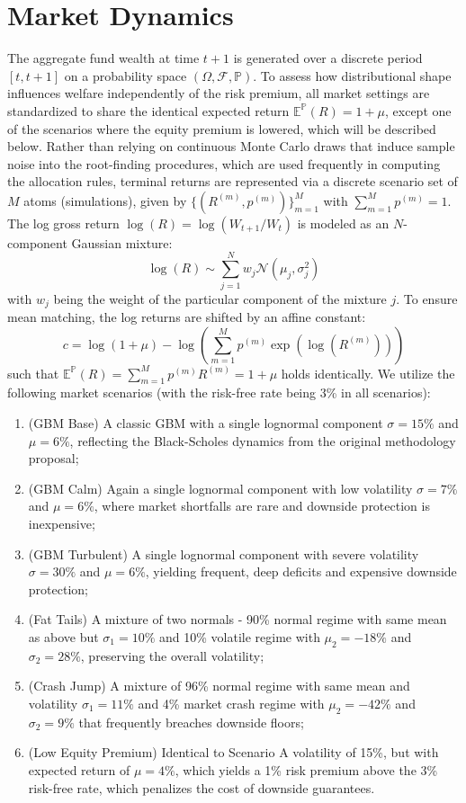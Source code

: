 \documentclass[11pt,a4paper]{article}
\theoremstyle{definition}
\theoremstyle{plain}
\theoremstyle{remark}
\newcommand{\E}{\mathbb{E}}
\renewcommand{\P}{\mathbb{P}}
\newcommand{\1}{\mathbf{1}}
\begin{document}
\section{Market Dynamics}
The aggregate fund wealth at time $t+1$ is generated over a discrete period $[t,t+1]$ on a probability space $(\Omega, \mathcal{F}, \P)$. To assess how distributional shape influences welfare independently of the risk premium, all market settings are standardized to share the identical expected return $\E^\P(R) = 1+\mu$, except one of the scenarios where the equity premium is lowered, which will be described below. Rather than relying on continuous Monte Carlo draws that induce sample noise into the root-finding procedures, which are used frequently in computing the allocation rules, terminal returns are represented via a discrete scenario set of $M$ atoms (simulations), given by $\{(R^{(m)}, p^{(m)})\}_{m=1}^M$ with $\sum_{m=1}^M p^{(m)} = 1$. The log gross return $\log(R) = \log(W_{t+1}/W_t)$ is modeled as an $N$-component Gaussian mixture:
\begin{equation*}
    \log(R) \sim \sum_{j=1}^N w_j \mathcal{N}(\mu_j, \sigma^2_j)
\end{equation*}
with $w_j$ being the weight of the particular component of the mixture $j$. To ensure mean matching, the log returns are shifted by an affine constant:
\begin{equation*}
    c = \log(1 + \mu) - \log\left(\sum_{m=1}^M p^{(m)} \exp(\log(R^{(m)}))\right)
\end{equation*}
such that $\E^\P(R) = \sum_{m=1}^M p^{(m)} R^{(m)} = 1 + \mu$ holds identically. We utilize the following market scenarios (with the risk-free rate being 3\% in all scenarios):
\begin{enumerate}
    \item[A:] (GBM Base) A classic GBM with a single lognormal component $\sigma = 15\%$ and $\mu = 6\%$, reflecting the Black-Scholes dynamics from the original methodology proposal;
    \item[B:] (GBM Calm) Again a single lognormal component with low volatility $\sigma = 7\%$ and $\mu = 6\%$, where market shortfalls are rare and downside protection is inexpensive;
    \item[C:] (GBM Turbulent) A single lognormal component with severe volatility $\sigma = 30\%$ and $\mu = 6\%$, yielding frequent, deep deficits and expensive downside protection;
    \item[D:] (Fat Tails) A mixture of two normals - 90\% normal regime with same mean as above but $\sigma_1 = 10\%$ and 10\% volatile regime with $\mu_2 = -18\%$ and $\sigma_2 = 28\%$, preserving the overall volatility;
    \item[E:] (Crash Jump) A mixture of 96\% normal regime with same mean and volatility $\sigma_1 = 11\%$ and 4\% market crash regime with $\mu_2 = -42\%$ and $\sigma_2 = 9\%$ that frequently breaches downside floors;
    \item[F:] (Low Equity Premium) Identical to Scenario A volatility of 15\%, but with expected return of $\mu = 4\%$, which yields a 1\% risk premium above the 3\% risk-free rate, which penalizes the cost of downside guarantees.
\end{enumerate}
\end{document}
